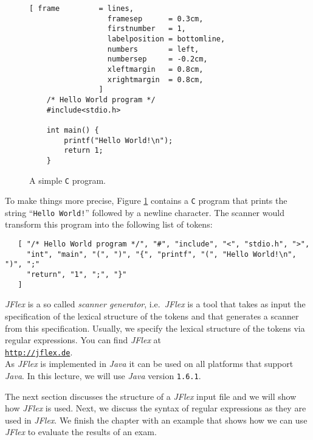 \begin{figure}[!ht]
\centering
\begin{Verbatim}[ frame         = lines, 
                  framesep      = 0.3cm, 
                  firstnumber   = 1,
                  labelposition = bottomline,
                  numbers       = left,
                  numbersep     = -0.2cm,
                  xleftmargin   = 0.8cm,
                  xrightmargin  = 0.8cm,
                ]
    /* Hello World program */
    #include<stdio.h>
    
    int main() {
        printf("Hello World!\n");
        return 1;
    }
\end{Verbatim}
\vspace*{-0.3cm}
\caption{A simple \texttt{C} program.}
\label{fig:hello-world.c}
\end{figure}

To make things more precise, Figure \ref{fig:hello-world.c} contains a \texttt{C} program that
prints the string ``\texttt{Hello World!}'' followed by a newline character.  The scanner would
transform this program into the following list of tokens:
\begin{verbatim}
   [ "/* Hello World program */", "#", "include", "<", "stdio.h", ">",
     "int", "main", "(", ")", "{", "printf", "(", "Hello World!\n", ")", ";"
     "return", "1", ";", "}"
   ]
\end{verbatim}

\textsl{JFlex}\/ \cite{klein:2009} is a so called  \emph{scanner generator}, i.e.~\textsl{JFlex} is
a tool that takes as input the specification of the lexical structure of the tokens and that
generates a scanner from this specification.  Usually, we specify the lexical structure of the
tokens via regular expressions.
You can find \textsl{JFlex} at 
\\[0.2cm]
\hspace*{1.3cm}
\href{http://jflex.de}{\texttt{http://jflex.de}}.
\\[0.2cm]
As \textsl{JFlex} is implemented in  \textsl{Java} it can be used on all platforms that support
\textsl{Java}.    In this lecture, we will use \textsl{Java} version \texttt{1.6.1}.

The next section discusses the structure of a  \textsl{JFlex} input file and we will show how
\textsl{JFlex} is used.  Next, we discuss the syntax of regular expressions as they are used in
\textsl{JFlex}.  We finish the chapter with an example that shows how we can use \textsl{JFlex} to
evaluate the results of an exam.

